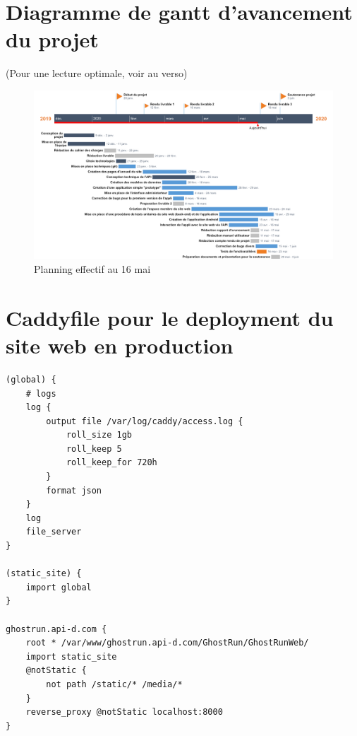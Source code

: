 \appendix


\listoffigures
\glsaddallunused
\printglossaries



\chapter{Diagramme de gantt d'avancement du projet}

(Pour une lecture optimale, voir au verso)

\begin{figure}
    \centering
    \includegraphics[keepaspectratio, width=\textwidth, height=\textheight]{ima/Planning-gantt}
    \caption{Planning effectif au 16 mai}
    \label{fig:91-Gantt}
\end{figure}


\chapter{Caddyfile pour le deployment du site web en production}

\begin{lstlisting}
(global) {
    # logs
    log {
        output file /var/log/caddy/access.log {
            roll_size 1gb
            roll_keep 5
            roll_keep_for 720h
        }
        format json
    }
    log
    file_server
}

(static_site) {
    import global
}

ghostrun.api-d.com {
    root * /var/www/ghostrun.api-d.com/GhostRun/GhostRunWeb/
    import static_site
    @notStatic {
        not path /static/* /media/*
    }
    reverse_proxy @notStatic localhost:8000
}
\end{lstlisting}